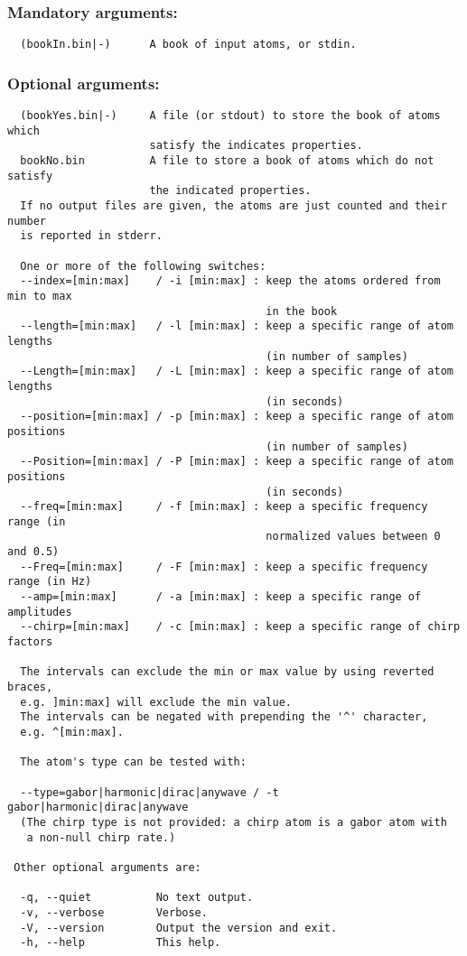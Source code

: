\documentclass[11pt,a4paper]{article}
\begin{document}
\subsubsection*{Mandatory arguments:}
\begin{verbatim}
  (bookIn.bin|-)      A book of input atoms, or stdin.
\end{verbatim}

\subsubsection*{Optional arguments:}
\begin{verbatim}
  (bookYes.bin|-)     A file (or stdout) to store the book of atoms which
                      satisfy the indicates properties.
  bookNo.bin          A file to store a book of atoms which do not satisfy
                      the indicated properties.
  If no output files are given, the atoms are just counted and their number
  is reported in stderr.

  One or more of the following switches:
  --index=[min:max]    / -i [min:max] : keep the atoms ordered from min to max
                                        in the book
  --length=[min:max]   / -l [min:max] : keep a specific range of atom lengths
                                        (in number of samples)
  --Length=[min:max]   / -L [min:max] : keep a specific range of atom lengths
                                        (in seconds)
  --position=[min:max] / -p [min:max] : keep a specific range of atom positions
                                        (in number of samples)
  --Position=[min:max] / -P [min:max] : keep a specific range of atom positions
                                        (in seconds)
  --freq=[min:max]     / -f [min:max] : keep a specific frequency range (in
                                        normalized values between 0 and 0.5)
  --Freq=[min:max]     / -F [min:max] : keep a specific frequency range (in Hz)
  --amp=[min:max]      / -a [min:max] : keep a specific range of amplitudes
  --chirp=[min:max]    / -c [min:max] : keep a specific range of chirp factors

  The intervals can exclude the min or max value by using reverted braces,
  e.g. ]min:max] will exclude the min value.
  The intervals can be negated with prepending the '^' character,
  e.g. ^[min:max].

  The atom's type can be tested with:

  --type=gabor|harmonic|dirac|anywave / -t gabor|harmonic|dirac|anywave
  (The chirp type is not provided: a chirp atom is a gabor atom with
   a non-null chirp rate.)

 Other optional arguments are:

  -q, --quiet          No text output.
  -v, --verbose        Verbose.
  -V, --version        Output the version and exit.
  -h, --help           This help.
\end{verbatim}
\end{document}
